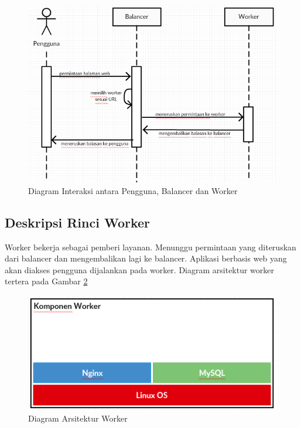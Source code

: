\documentclass{ta-its}
\begin{document}
			    \begin{figure}[] %
			    	\centering
			    	\includegraphics[width=\linewidth]{contoh_img/kerjabalancer}
			    	\caption{Diagram Interaksi antara Pengguna, Balancer dan Worker}
			    	\label{gambarKerjaBalancer}
			    \end{figure}
			
			\subsection{Deskripsi Rinci Worker}
				Worker bekerja sebagai pemberi layanan. Menunggu permintaan yang diteruskan dari balancer dan mengembalikan lagi ke balancer. Aplikasi berbasis web yang akan diakses pengguna dijalankan pada worker. Diagram arsitektur worker tertera pada Gambar \ref{gambarArsitekturWorker}
				
				\begin{figure}[] %
					\centering
					\includegraphics[width=\linewidth]{contoh_img/kompworker}
					\caption{Diagram Arsitektur Worker}
					\label{gambarArsitekturWorker}
				\end{figure}
				
\end{document}
